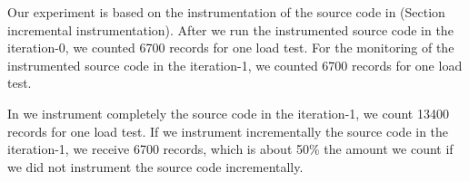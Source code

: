 Our experiment is based on the instrumentation of the source code in (Section incremental instrumentation). After we run the instrumented source code in the iteration-0, we counted 6700 records for one load test. For the monitoring of the instrumented source code in the iteration-1, we counted 6700 records for one load test. 

In we instrument completely the source code in the iteration-1, we count 13400 records for one load test. If we instrument incrementally the source code in the iteration-1, we receive 6700 records, which is about 50\% the amount we count if we did not instrument the source code incrementally.








